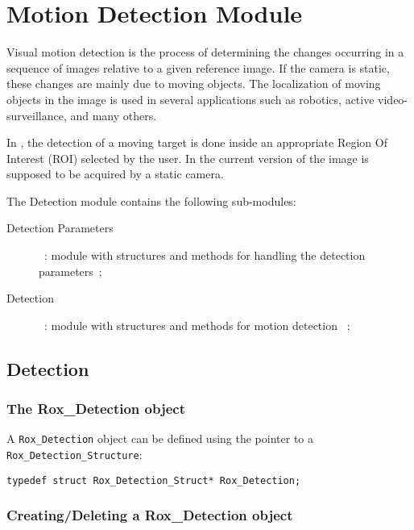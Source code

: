 \chapter{Motion Detection Module}
\label{cha:motion_detection}

Visual motion detection is the process of determining the changes
occurring in a sequence of images relative to a given reference
image. If the camera is static, these changes are mainly due to moving
objects. The localization of moving objects in the image is used in
several applications such as robotics, active video-surveillance, and many
others.

In \rox{}, the detection of a moving target is done inside an
appropriate Region Of Interest (ROI) selected by the user. In the
current version of \rox{} the image is supposed to be acquired by a
static camera.

The Detection module contains the following sub-modules:

\begin{description}
\item[Detection Parameters]~: module with structures and methods for handling the detection parameters~;
\item[Detection]~: module with structures and methods for motion detection ~;
\end{description}



\section{Detection}
\label{sec:detetion}

\subsection{The Rox\_Detection object}
\label{sse:detection_object}

A \lstinline$Rox_Detection$ object can be defined using the pointer to a \lstinline$Rox_Detection_Structure$:
\begin{lstlisting}
typedef struct Rox_Detection_Struct* Rox_Detection;
\end{lstlisting}

\subsection{Creating/Deleting a Rox\_Detection object}
\label{sss:detection_initializing}

